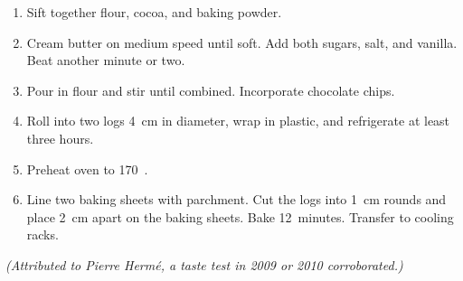 

\begin{ingredients}
\end{ingredients}


\begin{recipe}
  \begin{enumerate}

  \item Sift together flour, cocoa, and baking powder.

  \item Cream butter on medium speed until soft.  Add both sugars,
    salt, and vanilla.  Beat another minute or two.

  \item Pour in flour and stir until combined.  Incorporate chocolate
    chips.

  \item Roll into two logs 4~cm in diameter, wrap in plastic, and
    refrigerate at least three hours.

  \item Preheat oven to 170~\degreeC.

  \item Line two baking sheets with parchment.  Cut the logs into 1~cm
    rounds and place 2~cm apart on the baking sheets.  Bake
    12~minutes.  Transfer to cooling racks.

  \end{enumerate}
\end{recipe}


\textit{\footnotesize (Attributed to Pierre Herm\'e, a taste test in 2009 or 2010 corroborated.)}
